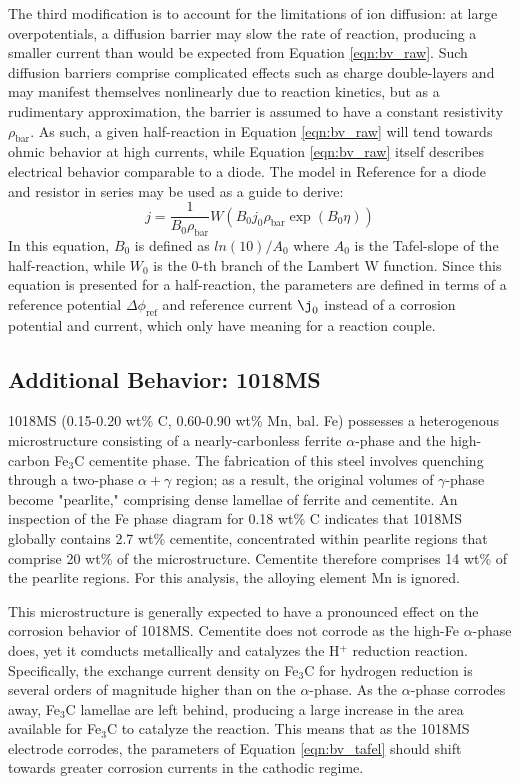 The third modification is to account for the limitations of ion diffusion: at large overpotentials, a diffusion barrier may slow the rate of reaction, producing a smaller current than would be expected from Equation \ref{eqn:bv_raw}.  Such diffusion barriers comprise complicated effects such as charge double-layers and may manifest themselves nonlinearly due to reaction kinetics, but as a rudimentary approximation, the barrier is assumed to have a constant resistivity $\rho_{\text{bar}}$.  As such, a given half-reaction in Equation \ref{eqn:bv_raw} will tend towards ohmic behavior at high currents, while Equation \ref{eqn:bv_raw} itself describes electrical behavior comparable to a diode.\cite{gsi}  The model in Reference \cite{lambert} for a diode and resistor in series may be used as a guide to derive:
%
	\begin{equation}
		j = \frac{1}{B_0 \rho_{\text{bar}}}
		W(B_0 j_0 \rho_{\text{bar}} \exp(B_0 \eta))
	\label{eqn:bv_w}
	\end{equation}
%
In this equation, $B_0$ is defined as $ln(10) / A_0$ where $A_0$ is the Tafel-slope of the half-reaction, while $W_0$ is the 0-th branch of the Lambert W function.  Since this equation is presented for a half-reaction, the parameters are defined in terms of a reference potential $\Delta \phi_{\text{ref}}$ and reference current $\j_0$ instead of a corrosion potential and current, which only have meaning for a reaction couple.

\subsection{Additional Behavior: 1018MS}

1018MS (0.15-0.20 wt\% C, 0.60-0.90 wt\% Mn, bal. Fe) possesses a heterogenous microstructure consisting of a nearly-carbonless ferrite $\alpha$-phase and the high-carbon Fe$_3$C cementite phase.\cite{labguide}  The fabrication of this steel involves quenching through a two-phase $\alpha + \gamma$ region; as a result, the original volumes of $\gamma$-phase become "pearlite," comprising dense lamellae of ferrite and cementite.  An inspection of the Fe phase diagram for 0.18 wt\% C indicates that 1018MS globally contains 2.7 wt\% cementite, concentrated within pearlite regions that comprise 20 wt\% of the microstructure.  Cementite therefore comprises 14 wt\% of the pearlite regions.  For this analysis, the alloying element Mn is ignored.

This microstructure is generally expected to have a pronounced effect on the corrosion behavior of 1018MS.  Cementite does not corrode as the high-Fe $\alpha$-phase does, yet it comducts metallically and catalyzes the H$^+$ reduction reaction.  Specifically, the exchange current density on Fe$_3$C for hydrogen reduction is several orders of magnitude higher than on the $\alpha$-phase.  As the $\alpha$-phase corrodes away, Fe$_3$C lamellae are left behind, producing a large increase in the area available for Fe$_3$C to catalyze the reaction.  This means that as the 1018MS electrode corrodes, the parameters of Equation \ref{eqn:bv_tafel} should shift towards greater corrosion currents in the cathodic regime.\cite{labguide}


